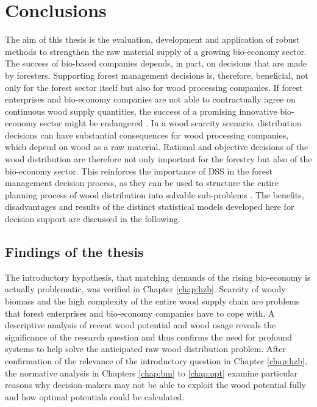 \chapter{Conclusions}
\label{chap:discussion}
\newpage
\noindent
The aim of this thesis is the evaluation, development and application of robust methods to strengthen the raw material supply of a growing bio-economy sector. The success of bio-based companies depends, in part, on decisions that are made by foresters. Supporting forest management decisions is, therefore, beneficial, not only for the forest sector itself but also for wood processing companies. If forest enterprises and bio-economy companies are not able to contractually agree on continuous wood supply quantities, the success of a promising innovative bio-economy sector might be endangered \citep[p. 221, 223]{elchichakli_2016}. In a wood scarcity scenario, distribution decisions can have substantial consequences for wood processing companies, which depend on wood as a raw material. Rational and objective decisions of the wood distribution are therefore not only important for the forestry but also of the bio-economy sector. This reinforces the importance of DSS in the forest management decision process, as they can be used to structure the entire planning process of wood distribution into solvable sub-problems \citep[p. 1065-1067]{pretzsch_2008}. The benefits, disadvantages and results of the distinct statistical models developed here for decision support are discussed in the following.

\section{Findings of the thesis}
\label{sec:discussion:findings}
The introductory hypothesis, that matching demands of the rising bio-economy is actually problematic, was verified in Chapter \ref{chap:hzb}. Scarcity of woody biomass and the high complexity of the entire wood supply chain are problems that forest enterprises and bio-economy companies have to cope with. A descriptive analysis of recent wood potential and wood usage reveals the significance of the research question and thus confirms the need for profound systems to help solve the anticipated raw wood distribution problem. After confirmation of the relevance of the introductory question in Chapter \ref{chap:hzb}, the normative analysis in Chapters \ref{chap:bm} to \ref{chap:opt} examine particular reasons why decision-makers may not be able to exploit the wood potential fully and how optimal potentials could be calculated.

